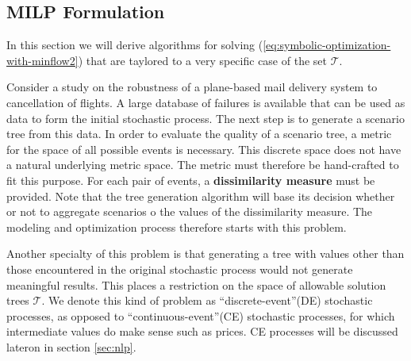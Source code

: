 \subsection{MILP Formulation}
\label{sec:MILP-selection-problem}
In this section we will derive algorithms for solving (\ref{eq:symbolic-optimization-with-minflow2}) that are taylored to a very specific case of the set $\mathcal{T}$.
\begin{comment}
Consider again the stochastic process arising from a repetetive coin toss of example \ref{ex:tree-necessity}.
In order to translate this process into a numerical framework, we will assign the values 0 to heads and 1 to tails.
Here, the underlying space of events and values is discrete.
Generating a tree with values other than those encountered in the original stochastic process would not generate meaningful results.
This places a restriction on the space of allowable solution trees $\mathcal{T}$: 
The tree may only contain values that were part of the original set of scenarios.
\end{comment}
Consider a study on the robustness of a plane-based mail delivery system to cancellation of flights.
A large database of failures is available that can be used as data to form the initial stochastic process.
The next step is to generate a scenario tree from this data.
In order to evaluate the quality of a scenario tree, a metric for the space of all possible events is necessary.
This discrete space does not have a natural underlying metric space.
The metric must therefore be hand-crafted to fit this purpose.
For each pair of events, a \textbf{dissimilarity measure} must be provided.
Note that the tree generation algorithm will base its decision whether or not to aggregate scenarios o the values of the dissimilarity measure.
The modeling and optimization process therefore starts with this problem.

Another specialty of this problem is that generating a tree with values other than those encountered in the original stochastic process would not generate meaningful results.
This places a restriction on the space of allowable solution trees $\mathcal{T}$.
We denote this kind of problem as ``discrete-event''(DE) stochastic processes, as opposed to ``continuous-event''(CE) stochastic processes, for which intermediate values do make sense such as prices. CE processes will be discussed lateron in section \ref{sec:nlp}.

